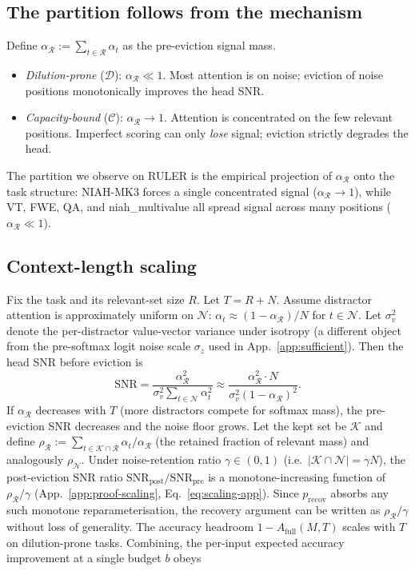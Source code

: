 \documentclass{article}
\begin{document}
\subsection{The partition follows from the mechanism}

Define $\alpha_{\mathcal{R}} := \sum_{t \in \mathcal{R}} \alpha_t$ as the
pre-eviction signal mass.
\begin{itemize}
  \item \emph{Dilution-prone} ($\mathcal{D}$): $\alpha_{\mathcal{R}} \ll 1$.
  Most attention is on noise; eviction of noise positions monotonically
  improves the head SNR.
  \item \emph{Capacity-bound} ($\mathcal{C}$): $\alpha_{\mathcal{R}} \to 1$.
  Attention is concentrated on the few relevant positions. Imperfect
  scoring can only \emph{lose} signal; eviction strictly degrades the
  head.
\end{itemize}
The partition we observe on RULER is the empirical projection of
$\alpha_{\mathcal{R}}$ onto the task structure: NIAH-MK3 forces a
single concentrated signal ($\alpha_{\mathcal{R}} \to 1$), while VT, FWE,
QA, and niah\_multivalue all spread signal across many positions
($\alpha_{\mathcal{R}} \ll 1$).

\subsection{Context-length scaling}

Fix the task and its relevant-set size $R$. Let $T = R + N$. Assume
distractor attention is approximately uniform on $\mathcal{N}$:
$\alpha_t \approx (1 - \alpha_{\mathcal{R}}) / N$ for $t \in \mathcal{N}$.
Let $\sigma_v^2$ denote the per-distractor value-vector variance under
isotropy (a different object from the pre-softmax logit noise scale
$\sigma_z$ used in App.~\ref{app:sufficient}). Then the head SNR before
eviction is
\[
\mathrm{SNR} = \frac{\alpha_{\mathcal{R}}^2}{\sigma_v^2 \sum_{t \in \mathcal{N}}
\alpha_t^2} \approx \frac{\alpha_{\mathcal{R}}^2 \cdot N}{\sigma_v^2 (1 -
\alpha_{\mathcal{R}})^2}.
\]
If $\alpha_{\mathcal{R}}$ decreases with $T$ (more distractors compete for
softmax mass), the pre-eviction SNR decreases and the noise floor grows.
Let the kept set be $\mathcal{K}$ and define $\rho_{\mathcal{R}} :=
\sum_{t \in \mathcal{K} \cap \mathcal{R}} \alpha_t / \alpha_{\mathcal{R}}$
(the retained fraction of relevant mass) and analogously $\rho_{\mathcal{N}}$.
Under noise-retention ratio $\gamma \in (0, 1)$ (i.e.\ $|\mathcal{K} \cap
\mathcal{N}| = \gamma N$), the post-eviction SNR ratio
$\mathrm{SNR}_{\mathrm{post}} / \mathrm{SNR}_{\mathrm{pre}}$ is a
monotone-increasing function of $\rho_{\mathcal{R}} / \gamma$
(App.~\ref{app:proof-scaling}, Eq.~\eqref{eq:scaling-app}). Since
$p_{\mathrm{recov}}$ absorbs any such monotone reparameterisation, the
recovery argument can be written as $\rho_{\mathcal{R}} / \gamma$ without
loss of generality. The accuracy headroom $1 - A_{\mathrm{full}}(M, T)$
scales with $T$ on dilution-prone tasks. Combining, the per-input expected
accuracy improvement at a single budget $b$ obeys
\end{document}
